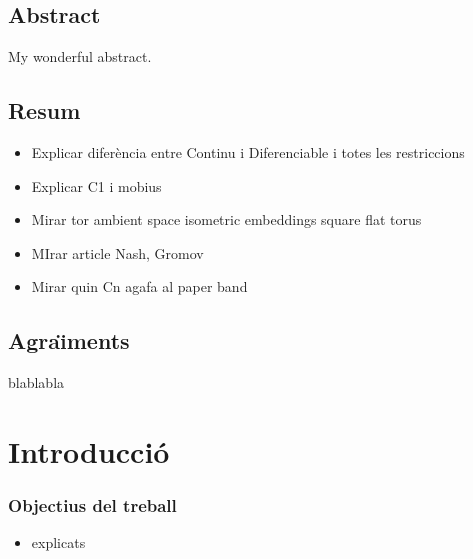 \documentclass[11pt,a4paper,openright,oneside]{book}
\numberwithin{equation}{section}
\theoremstyle{definition}
\begin{document}
\newpage
{} 

\section*{Abstract}
My wonderful abstract.


\section*{Resum}
\begin{itemize}
    \item Explicar diferència entre Continu i Diferenciable i totes les restriccions
    \item Explicar C1 i mobius
    \item Mirar tor ambient space isometric embeddings square flat torus
    \item MIrar article Nash, Gromov
    \item Mirar quin Cn agafa al paper band
\end{itemize}

\newpage 


\section*{Agra\"{\i}ments}

blablabla
\newpage

\tableofcontents

\newpage

\chapter{Introducci\'o}



\subsection*{Objectius del treball}

\begin{itemize}
    \item explicats
\end{itemize}
\end{document}
